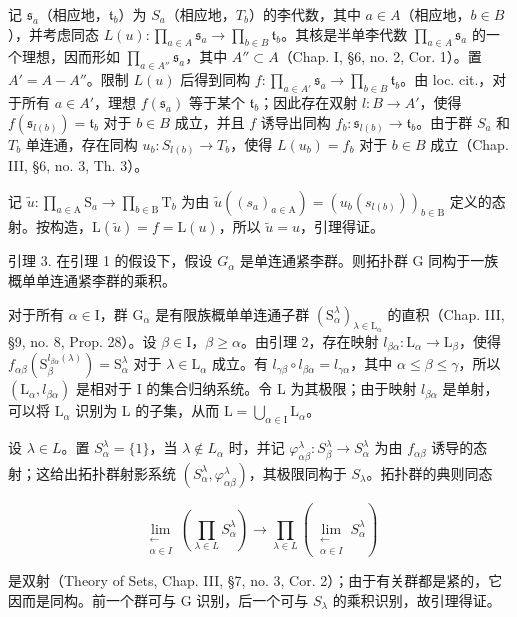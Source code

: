 记 \(\mathfrak{s}_a\)（相应地，\(\mathfrak{t}_b\)）为 \(S_a\)（相应地，\(T_b\)）的李代数，其中 \(a \in A\)（相应地，\(b \in B\)），并考虑同态 \(L(u): \prod_{a \in A} \mathfrak{s}_a \to \prod_{b \in B} \mathfrak{t}_b\)。其核是半单李代数 \(\prod_{a \in A} \mathfrak{s}_a\) 的一个理想，因而形如 \(\prod_{a \in A''} \mathfrak{s}_a\)，其中 \(A'' \subset A\)（Chap. I, §6, no. 2, Cor. 1）。置 \(A' = A - A''\)。限制 \(L(u)\) 后得到同构 \(f: \prod_{a \in A'} \mathfrak{s}_a \to \prod_{b \in B} \mathfrak{t}_b\)。由 loc. cit.，对于所有 \(a \in A'\)，理想 \(f(\mathfrak{s}_a)\) 等于某个 \(\mathfrak{t}_b\)；因此存在双射 \(l: B \to A'\)，使得 \(f(\mathfrak{s}_{l(b)}) = \mathfrak{t}_b\) 对于 \(b \in B\) 成立，并且 \(f\) 诱导出同构 \(f_b: \mathfrak{s}_{l(b)} \to \mathfrak{t}_b\)。由于群 \(S_a\) 和 \(T_b\) 单连通，存在同构 \(u_b: S_{l(b)} \to T_b\)，使得 \(L(u_b) = f_b\) 对于 \(b \in B\) 成立（Chap. III, §6, no. 3, Th. 3）。

记 \(\tilde{u}:\prod_{a\in \mathrm{A}}\mathrm{S}_a\to \prod_{b\in \mathrm{B}}\mathrm{T}_b\) 为由 \(\tilde{u} ((s_a)_{a\in \mathrm{A}}) = (u_b(s_{l(b)}))_{b\in \mathrm{B}}\) 定义的态射。按构造，\(\mathrm{L}(\tilde{u}) = f = \mathrm{L}(u)\)，所以 \(\tilde{u} = u\)，引理得证。

引理 3. 在引理 1 的假设下，假设 \(G_{\alpha}\) 是单连通紧李群。则拓扑群 G 同构于一族概单单连通紧李群的乘积。

对于所有 \(\alpha \in \mathrm{I}\)，群 \(\mathrm{G}_{\alpha}\) 是有限族概单单连通子群 \((\mathrm{S}_{\alpha}^{\lambda})_{\lambda \in \mathrm{L}_{\alpha}}\) 的直积（Chap. III, §9, no. 8, Prop. 28）。设 \(\beta \in \mathrm{I}\)，\(\beta \geq \alpha\)。由引理 2，存在映射 \(l_{\beta \alpha}: \mathrm{L}_{\alpha} \to \mathrm{L}_{\beta}\)，使得 \(f_{\alpha \beta}(\mathrm{S}_{\beta}^{l_{\beta \alpha}(\lambda)}) = \mathrm{S}_{\alpha}^{\lambda}\) 对于 \(\lambda \in \mathrm{L}_{\alpha}\) 成立。有 \(l_{\gamma \beta} \circ l_{\beta \alpha} = l_{\gamma \alpha}\)，其中 \(\alpha \leq \beta \leq \gamma\)，所以 \((\mathrm{L}_{\alpha}, l_{\beta \alpha})\) 是相对于 I 的集合归纳系统。令 L 为其极限；由于映射 \(l_{\beta \alpha}\) 是单射，可以将 \(\mathrm{L}_{\alpha}\) 识别为 L 的子集，从而 \(\mathrm{L} = \bigcup_{\alpha \in \mathrm{I}} \mathrm{L}_{\alpha}\)。

设 \(\lambda \in L\)。置 \(S_{\alpha}^{\lambda} = \{1\}\)，当 \(\lambda \notin L_{\alpha}\) 时，并记 \(\varphi_{\alpha \beta}^{\lambda}: S_{\beta}^{\lambda} \to S_{\alpha}^{\lambda}\) 为由 \(f_{\alpha \beta}\) 诱导的态射；这给出拓扑群射影系统 \((S_{\alpha}^{\lambda}, \varphi_{\alpha \beta}^{\lambda})\)，其极限同构于 \(S_{\lambda}\)。拓扑群的典则同态

\[
\lim_{\substack{\longleftarrow \\ \alpha \in I}}\left(\prod_{\lambda \in L}S_{\alpha}^{\lambda}\right)\to \prod_{\lambda \in L}\left(\lim_{\substack{\longleftarrow \\ \alpha \in I}}S_{\alpha}^{\lambda}\right)
\]

是双射（Theory of Sets, Chap. III, §7, no. 3, Cor. 2）；由于有关群都是紧的，它因而是同构。前一个群可与 G 识别，后一个可与 \(S_{\lambda}\) 的乘积识别，故引理得证。

